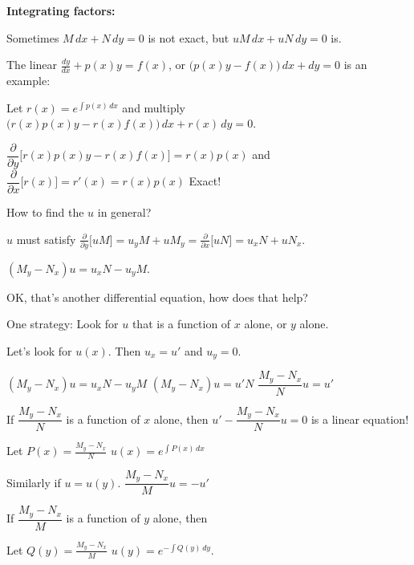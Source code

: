 \documentclass[10pt,aspectratio=169]{beamer}
\begin{document}
\begin{frame}
\textbf{Integrating factors:}

Sometimes \quad $M\, dx + N \, dy = 0$ \quad is not exact, but \quad $u M \, dx + u N \, dy = 0$ \quad is.

\medskip
\pause

The linear
\quad
$\displaystyle
\frac{dy}{dx} + p(x) y = f(x)$, \quad
or \quad $\bigl( p(x) y - f(x) \bigr)\, dx +  dy  = 0$ \quad
is an example:

\medskip
\pause

Let $r(x) = e^{\int p(x)\,dx}$ and multiply
\qquad
$\displaystyle
\bigl(r(x) p(x) y - r(x) f(x) \bigr)\, dx + r(x) \, dy = 0$.

\medskip
\pause

$\dfrac{\partial}{\partial y}
\bigl[ r(x) p(x) y - r(x) f(x) \bigr] = r(x) p(x)$
\quad
and
\quad
$\dfrac{\partial}{\partial x}
\bigl[ r(x) \bigr] = r'(x) = r(x) p(x)$
\pause
\wthus
Exact!

\medskip
\pause

How to find the $u$ in general?

\medskip
\pause

$u$ must satisfy
\quad
$\displaystyle
\frac{\partial}{\partial y} \bigl[ u M \bigr] = 
u_y M + u M_y = 
\frac{\partial}{\partial x} \bigl[ u N \bigr] = 
u_x N + u N_x$.

\medskip
\pause

\thus \quad
$(M_y-N_x)u = u_x N - u_y M$.

\medskip
\pause

OK, that's another differential equation, how does that help?

\medskip
\pause

One strategy: Look for $u$ that is a function of $x$ alone, or $y$ alone.

\end{frame}

\begin{frame}
Let's look for $u(x)$.  Then $u_x = u'$ and $u_y = 0$.

\medskip
\pause

$(M_y-N_x)u = u_x N - u_y M$
\pause
\wthus
$(M_y-N_x)u = u' N$
\pause
\wthus
$\dfrac{M_y-N_x}{N}u = u'$

\medskip
\pause

If $\dfrac{M_y-N_x}{N}$ is a function of $x$ alone, then
\quad
$u' - \dfrac{M_y-N_x}{N} u = 0$ \quad is a linear equation!

\medskip
\pause

Let $P(x) = \frac{M_y-N_x}{N}$
\wthus
$u(x) = e^{\int P(x) \, dx}$

\medskip
\pause

Similarly if $u = u(y)$.
\pause
\wthus
$\dfrac{M_y-N_x}{M} u = - u'$

\medskip
\pause

If $\dfrac{M_y-N_x}{M}$ is a function of $y$ alone, then

\medskip
\pause

Let $Q(y) = \frac{M_y-N_x}{M}$
\wthus
$u(y) = e^{-\int Q(y) \, dy}$.

\end{frame}
\end{document}
